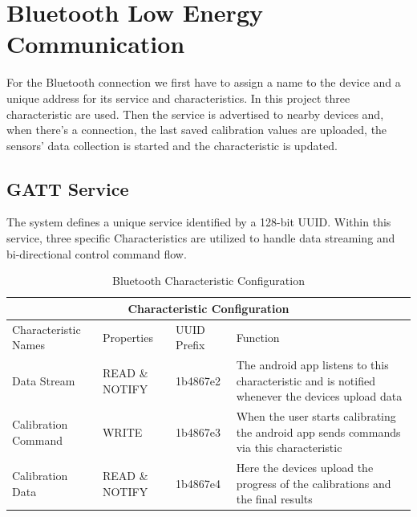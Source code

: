
\section{Bluetooth Low Energy Communication}
\label{sec:arduino_ble_com}

For the Bluetooth connection we first have to assign a name to the device and a unique address for its service and characteristics. In this project three characteristic are used.
Then the service is advertised to nearby devices and, when there's a connection, the last saved calibration values are uploaded, the sensors' data collection is started and the characteristic is updated.%

\subsection{GATT Service}
\label{ssec:arduino_gatt}

The system defines a unique service identified by a 128-bit UUID. Within this service, three specific Characteristics are utilized to handle data streaming and bi-directional control command flow.

\begin{table}[ht]
  \centering
  \caption{Bluetooth Characteristic Configuration}
  \label{tab:gatt_config}
  \renewcommand{\arraystretch}{1.5}
  \begin{tabular}{|m{3.2cm}||m{2.8cm}|m{2.2cm}|m{5cm}|}
    \hline
    \multicolumn{4}{|c|}{\textbf{Characteristic Configuration}} \\
    \hline
    Characteristic Names&Properties&UUID Prefix&Function\\
    \hline
    Data Stream& READ \& \newline NOTIFY&1b4867e2&The android app listens to this characteristic and is notified whenever the devices upload data\\
    Calibration \newline Command& WRITE&1b4867e3&When the user starts calibrating the android app sends commands via this characteristic\\
    Calibration Data& READ \& \newline NOTIFY&1b4867e4&Here the devices upload the progress of the calibrations and the final results\\
    \hline
  \end{tabular}
\end{table}

